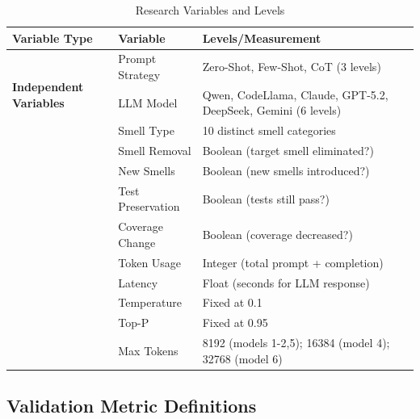 \begin{table}[h]
\centering
\caption{Research Variables and Levels}
\label{tab:variables}
\begin{tabular}{@{}p{4cm}p{3cm}p{6cm}@{}}
\toprule
\textbf{Variable Type} & \textbf{Variable} & \textbf{Levels/Measurement} \\ \midrule
\multirow{3}{4cm}{\textbf{Independent Variables}} & 
  Prompt Strategy & 
  Zero-Shot, Few-Shot, CoT (3 levels) \\
 & LLM Model & 
  Qwen, CodeLlama, Claude, GPT-5.2, DeepSeek, Gemini (6 levels) \\
 & Smell Type & 
  10 distinct smell categories \\ 
\addlinespace
\midrule
\multirow{6}{4cm}{\textbf{Dependent Variables}} & 
  Smell Removal & 
  Boolean (target smell eliminated?) \\
 & New Smells & 
  Boolean (new smells introduced?) \\
 & Test Preservation & 
  Boolean (tests still pass?) \\
 & Coverage Change & 
  Boolean (coverage decreased?) \\
 & Token Usage & 
  Integer (total prompt + completion) \\
 & Latency & 
  Float (seconds for LLM response) \\
\addlinespace
\midrule
\multirow{3}{4cm}{\textbf{Control Variables}} & 
  Temperature & 
  Fixed at 0.1 \\
 & Top-P & 
  Fixed at 0.95 \\
 & Max Tokens & 
  8192 (models 1-2,5); 16384 (model 4); 32768 (model 6) \\ \bottomrule
\end{tabular}
\end{table}

\subsection{Validation Metric Definitions}


